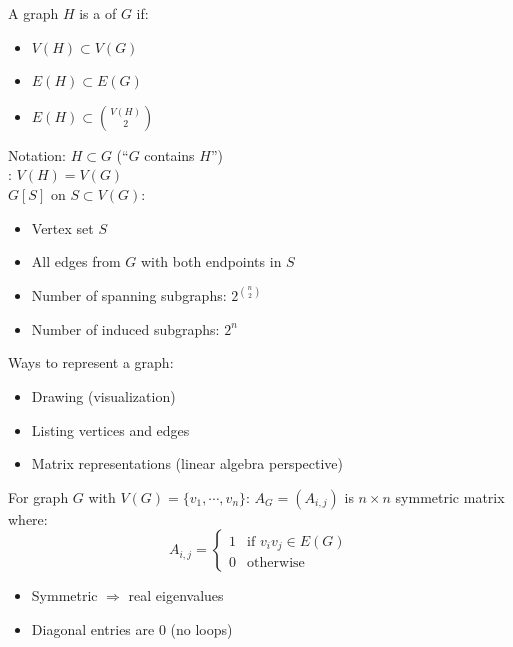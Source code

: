 \documentclass[8pt,a4paper,landscape]{extarticle}
\begin{document}
\begin{cscolumns}
\columnbreak
\begin{definition}[Subgraphs]
A graph $H$ is a  of $G$ if:
\begin{itemize}
\item $V(H)\subset V(G)$
\item $E(H)\subset E(G)$
\item $E(H)\subset\binom{V(H)}{2}$
\end{itemize}
Notation: $H\subset G$ (``$G$ contains $H$'')\\
: $V(H)=V(G)$\\
 $G[S]$ on $S\subset V(G)$:
\begin{itemize}
\item Vertex set $S$
\item All edges from $G$ with both endpoints in $S$
\end{itemize}
\end{definition}

\begin{theorem}
\begin{itemize}
\item Number of spanning subgraphs: $2^{\binom{n}{2}}$
\item Number of induced subgraphs: $2^n$
\end{itemize}
\end{theorem}

Ways to represent a graph:
\begin{itemize}
\item Drawing (visualization)
\item Listing vertices and edges
\item Matrix representations (linear algebra perspective)
\end{itemize}

\begin{definition}
For graph $G$ with $V(G)=\{v_1,\cdots,v_n\}$: $A_G=(A_{i,j})$ is $n\times n$ symmetric matrix where:
\[ A_{i,j}=\begin{cases}1 & \text{if } v_iv_j\in E(G)\\ 0 & \text{otherwise}\end{cases} \]
\end{definition}
\begin{theorem}[Properties of $A_G$]
\begin{itemize}
\item Symmetric $\Rightarrow$ real eigenvalues
\item Diagonal entries are 0 (no loops)
\end{itemize}
\end{theorem}


\end{cscolumns}
\end{document}
